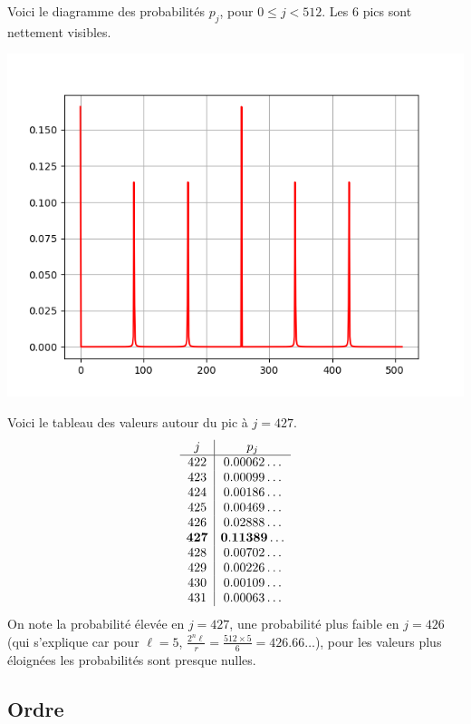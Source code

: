 \documentclass[11pt,class=report,crop=false]{standalone}
\begin{document}
Voici le diagramme des probabilités $p_j$, pour $0 \le j < 512$. Les $6$ pics sont nettement visibles.
\begin{center}
   \includegraphics[scale=\myscale,scale=0.8]{figures/shor}
\end{center}
	
Voici le tableau des valeurs autour du pic à $j=427$.
$$\begin{array}{c|c}
j & p_j \\ \hline
422 &  0.00062\ldots \\
423 &  0.00099\ldots \\
424 &  0.00186\ldots \\
425 &  0.00469\ldots \\
426 &  0.02888\ldots \\
{\bf 427} &  {\bf 0.11389\ldots} \\
428 &  0.00702\ldots \\
429 &  0.00226\ldots \\
430 &  0.00109\ldots \\
431 &  0.00063\ldots \\
\end{array}
$$
On note la probabilité élevée en $j=427$, une probabilité plus faible en $j=426$
(qui s'explique car pour $\ell=5$, $\frac{2^n\ell}{r} = \frac{512\times5}{6} = 426.66\ldots$), pour les valeurs plus éloignées les probabilités sont presque nulles.

 

\subsection{Ordre}
\end{document}

